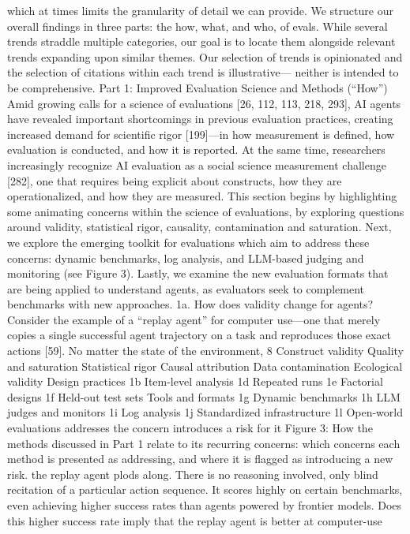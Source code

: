 which at times limits the granularity of detail we can provide.
We structure our overall findings in three parts: the how, what, and who, of evals. While several trends
straddle multiple categories, our goal is to locate them alongside relevant trends expanding upon similar
themes. Our selection of trends is opinionated and the selection of citations within each trend is illustrative—
neither is intended to be comprehensive.
Part 1: Improved Evaluation Science and Methods (“How”)
Amid growing calls for a science of evaluations [26, 112, 113, 218, 293], AI agents have revealed important
shortcomings in previous evaluation practices, creating increased demand for scientific rigor [199]—in
how measurement is defined, how evaluation is conducted, and how it is reported. At the same time,
researchers increasingly recognize AI evaluation as a social science measurement challenge [282], one that
requires being explicit about constructs, how they are operationalized, and how they are measured.
This section begins by highlighting some animating concerns within the science of evaluations, by exploring
questions around validity, statistical rigor, causality, contamination and saturation. Next, we explore the
emerging toolkit for evaluations which aim to address these concerns: dynamic benchmarks, log analysis,
and LLM-based judging and monitoring (see Figure 3). Lastly, we examine the new evaluation formats
that are being applied to understand agents, as evaluators seek to complement benchmarks with new
approaches.
1a. How does validity change for agents?
Consider the example of a “replay agent” for computer use—one that merely copies a single successful
agent trajectory on a task and reproduces those exact actions [59]. No matter the state of the environment,
8
Construct
validity
Quality and
saturation
Statistical
rigor
Causal
attribution
Data
contamination
Ecological
validity
Design practices
1b
Item-level analysis
1d
Repeated runs
1e
Factorial designs
1f
Held-out test sets
Tools and formats
1g
Dynamic benchmarks
1h
LLM judges and monitors
1i
Log analysis
1j
Standardized infrastructure
1l
Open-world evaluations
addresses the concern
introduces a risk for it
Figure 3: How the methods discussed in Part 1 relate to its recurring concerns: which concerns each method is
presented as addressing, and where it is flagged as introducing a new risk.
the replay agent plods along. There is no reasoning involved, only blind recitation of a particular action
sequence. It scores highly on certain benchmarks, even achieving higher success rates than agents powered
by frontier models. Does this higher success rate imply that the replay agent is better at computer-use
